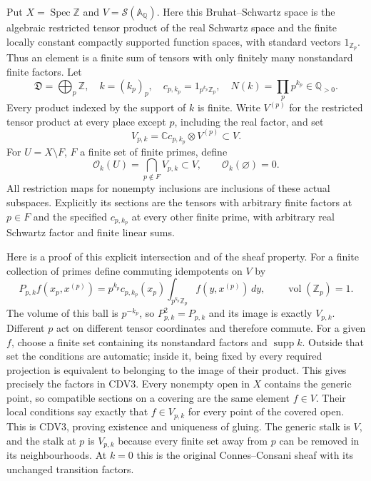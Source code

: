 Put $X=\operatorname{Spec}\mathbb Z$ and
$V=\mathcal S(\mathbb A_{\mathbb Q})$. Here this Bruhat--Schwartz
space is the algebraic restricted tensor product of the real Schwartz
space and the finite locally constant compactly supported function
spaces, with standard vectors $1_{\mathbb Z_p}$. Thus an element is a
finite sum of tensors with only finitely many nonstandard finite
factors. Let
\begin{equation}\tag{CDV1}
 \mathfrak D=\bigoplus_p\mathbb Z,
 \quad k=(k_p)_p,\quad
 c_{p,k_p}=1_{p^{k_p}\mathbb Z_p},\quad
 N(k)=\prod_p p^{k_p}\in\mathbb Q_{>0}.
\end{equation}
Every product indexed by the support of $k$ is finite. Write
$V^{(p)}$ for the restricted tensor product at every place except $p$,
including the real factor, and set
\begin{equation}\tag{CDV2}
 V_{p,k}=\mathbb Cc_{p,k_p}\otimes V^{(p)}\subset V.
\end{equation}
For $U=X\setminus F$, $F$ a finite set of finite primes, define
\begin{equation}\tag{CDV3}
 \mathcal O_k(U)=\bigcap_{p\notin F}V_{p,k}\subset V,
 \qquad \mathcal O_k(\varnothing)=0.
\end{equation}
All restriction maps for nonempty inclusions are inclusions of these
actual subspaces. Explicitly its sections are the tensors with arbitrary
finite factors at $p\in F$ and the specified $c_{p,k_p}$ at every
other finite prime, with arbitrary real Schwartz factor and finite
linear sums.

Here is a proof of this explicit intersection and of the sheaf property.
For a finite collection of primes define commuting idempotents on $V$
by
\begin{equation}\tag{CDV4}
 P_{p,k}f(x_p,x^{(p)})
 =p^{k_p}c_{p,k_p}(x_p)
                  \int_{p^{k_p}\mathbb Z_p}f(y,x^{(p)})\,dy,
 \qquad \operatorname{vol}(\mathbb Z_p)=1.
\end{equation}
The volume of this ball is $p^{-k_p}$, so $P_{p,k}^2=P_{p,k}$
and its image is exactly $V_{p,k}$. Different $p$ act on different
tensor coordinates and therefore commute. For a given $f$, choose a
finite set containing its nonstandard factors and $\operatorname{supp}k$.
Outside that set the conditions are automatic; inside it, being fixed
by every required projection is equivalent to belonging to the image
of their product. This gives precisely the factors in CDV3.
Every nonempty open in $X$ contains the generic point, so compatible
sections on a covering are the same element $f\in V$. Their local
conditions say exactly that $f\in V_{p,k}$ for every point of the
covered open. This is CDV3, proving existence and uniqueness of gluing.
The generic stalk is $V$, and the stalk at $p$ is $V_{p,k}$ because
every finite set away from $p$ can be removed in its neighbourhoods.
At $k=0$ this is the original Connes--Consani sheaf with its unchanged
transition factors.

